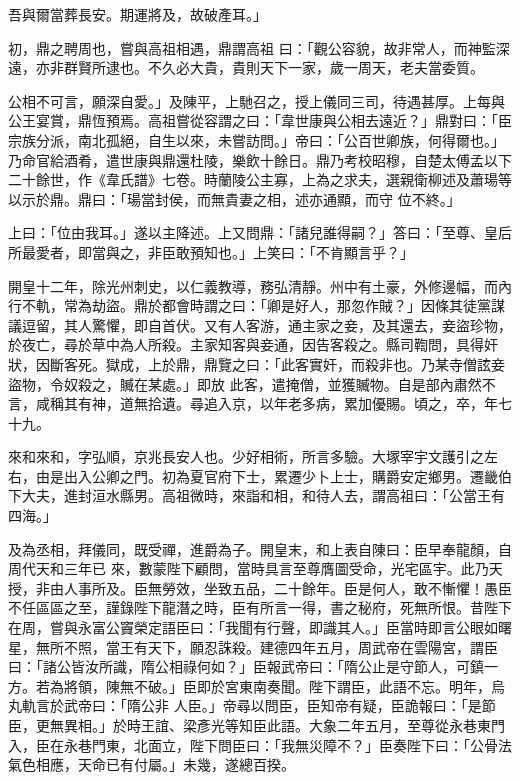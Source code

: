 \begin{pinyinscope}
 吾與爾當葬長安。期運將及，故破產耳。」



 初，鼎之聘周也，嘗與高祖相遇，鼎謂高祖
 曰：「觀公容貌，故非常人，而神監深遠，亦非群賢所逮也。不久必大貴，貴則天下一家，歲一周天，老夫當委質。



 公相不可言，願深自愛。」及陳平，上馳召之，授上儀同三司，待遇甚厚。上每與公王宴賞，鼎恆預焉。高祖嘗從容謂之曰：「韋世康與公相去遠近？」鼎對曰：「臣宗族分派，南北孤絕，自生以來，未嘗訪問。」帝曰：「公百世卿族，何得爾也。」乃命官給酒肴，遣世康與鼎還杜陵，樂飲十餘日。鼎乃考校昭穆，自楚太傅孟以下二十餘世，作《韋氏譜》七卷。時蘭陵公主寡，上為之求夫，選親衛柳述及蕭瑒等以示於鼎。鼎曰：「瑒當封侯，而無貴妻之相，述亦通顯，而守
 位不終。」



 上曰：「位由我耳。」遂以主降述。上又問鼎：「諸兒誰得嗣？」答曰：「至尊、皇后所最愛者，即當與之，非臣敢預知也。」上笑曰：「不肯顯言乎？」



 開皇十二年，除光州刺史，以仁義教導，務弘清靜。州中有土豪，外修邊幅，而內行不軌，常為劫盜。鼎於都會時謂之曰：「卿是好人，那忽作賊？」因條其徒黨謀議逗留，其人驚懼，即自首伏。又有人客游，通主家之妾，及其還去，妾盜珍物，於夜亡，尋於草中為人所殺。主家知客與妾通，因告客殺之。縣司鞫問，具得奸狀，因斷客死。獄成，上於鼎，鼎覽之曰：「此客實奸，而殺非也。乃某寺僧詃妾盜物，令奴殺之，贓在某處。」即放
 此客，遣掩僧，並獲贓物。自是部內肅然不言，咸稱其有神，道無拾遺。尋追入京，以年老多病，累加優賜。頃之，卒，年七十九。



 來和來和，字弘順，京兆長安人也。少好相術，所言多驗。大塚宰宇文護引之左右，由是出入公卿之門。初為夏官府下士，累遷少卜上士，購爵安定鄉男。遷畿伯下大夫，進封洹水縣男。高祖微時，來詣和相，和待人去，謂高祖曰：「公當王有四海。」



 及為丞相，拜儀同，既受禪，進爵為子。開皇末，和上表自陳曰：臣早奉龍顏，自周代天和三年已
 來，數蒙陛下顧問，當時具言至尊膺圖受命，光宅區宇。此乃天授，非由人事所及。臣無勞效，坐致五品，二十餘年。臣是何人，敢不慚懼！愚臣不任區區之至，謹錄陛下龍潛之時，臣有所言一得，書之秘府，死無所恨。昔陛下在周，嘗與永富公竇榮定語臣曰：「我聞有行聲，即識其人。」臣當時即言公眼如曙星，無所不照，當王有天下，願忍誅殺。建德四年五月，周武帝在雲陽宮，謂臣曰：「諸公皆汝所識，隋公相祿何如？」臣報武帝曰：「隋公止是守節人，可鎮一方。若為將領，陳無不破。」臣即於宮東南奏聞。陛下謂臣，此語不忘。明年，烏丸軌言於武帝曰：「隋公非
 人臣。」帝尋以問臣，臣知帝有疑，臣詭報曰：「是節臣，更無異相。」於時王誼、梁彥光等知臣此語。大象二年五月，至尊從永巷東門入，臣在永巷門東，北面立，陛下問臣曰：「我無災障不？」臣奏陛下曰：「公骨法氣色相應，天命已有付屬。」未幾，遂總百揆。




\end{pinyinscope}
